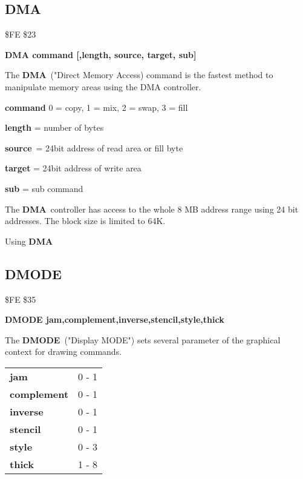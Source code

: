 \subsection{DMA}
\begin{description}[leftmargin=3cm,style=nextline]
\item [Token:] \$FE \$23
\item [Format:] {\bf DMA command [,length, source, target, sub]}
\item [Usage:]
   The {\bf DMA} ("Direct Memory Access) command is the fastest method
   to manipulate memory areas using the DMA controller.

   {\bf command} 0 = copy, 1 = mix, 2 = swap, 3 = fill

   {\bf length} = number of bytes

   {\bf source} = 24bit address of read area or fill byte

   {\bf target} = 24bit address of write area

   {\bf sub} = sub command

\item [Remarks:]
   The {\bf DMA} controller has access to the whole 8 MB address range
   using 24 bit addresses.
 The block size is limited to 64K.
\item [Example:] Using {\bf DMA}
\end{description}


\newpage
\subsection{DMODE}
\begin{description}[leftmargin=3cm,style=nextline]
\item [Token:] \$FE \$35
\item [Format:] {\bf DMODE jam,complement,inverse,stencil,style,thick}
\item [Usage:]
   The {\bf DMODE} ("Display MODE") sets several parameter
   of the graphical context for drawing commands.

\ttfamily
\begin{tabular}{|l|l|}
\hline
   {\bf jam}        &  0 - 1 \\
   {\bf complement} &  0 - 1 \\
   {\bf inverse}    &  0 - 1 \\
   {\bf stencil}    &  0 - 1 \\
   {\bf style}      &  0 - 3 \\
   {\bf thick}      &  1 - 8 \\
\hline
\end{tabular}
\end{description}

